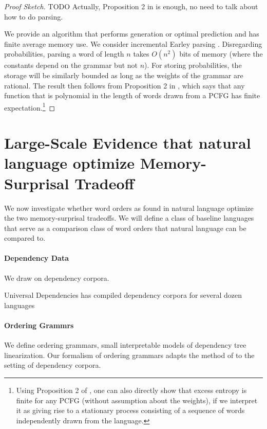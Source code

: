 \documentclass[11pt,letterpaper]{article}
\begin{document}
\begin{proof}[Proof Sketch]
	TODO Actually, Proposition 2 in \cite{chi-statistical-1999} is enough, no need to talk about how to do parsing.

	We provide an algorithm that performs generation or optimal prediction and has finite average memory use. We consider incremental Earley parsing \citep{earley-efficient-1970}. Disregarding probabilities, parsing a word of length $n$ takes $O(n^2)$ bits of memory (where the constants depend on the grammar but not $n$). For storing probabilities, the storage will be similarly bounded as long as the weights of the grammar are rational.
	The result then follows from Proposition 2 in \cite{chi-statistical-1999}, which says that any function that is polynomial in the length of words drawn from a PCFG has finite expectation.\footnote{Using Proposition 2 of \cite{chi-statistical-1999}, one can also directly show that excess entropy is finite for any PCFG (without assumption about the weights), if we interpret it as giving rise to a stationary process consisting of a sequence of words independently drawn from the language.}
\end{proof}




\section{Large-Scale Evidence that natural language optimize Memory-Surprisal Tradeoff}

We now investigate whether word orders as found in natural language optimize the two memory-surprisal tradeoffs.
We will define a class of baseline languages that serve as a comparison class of word orders that natural language can be compared to.



\paragraph{Dependency Data}
We draw on dependency corpora.

Universal Dependencies has compiled dependency corpora for several dozen languages



\paragraph{Ordering Grammrs}
We define ordering grammars, small interpretable models of dependency tree linearization.
Our formalism of ordering grammars adapts the method of \cite{gildea-optimizing-2007, gildea-grammars-2010, gildea-human-2015} to the setting of dependency corpora.
\end{document}
